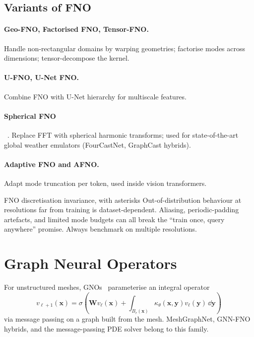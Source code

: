 \subsection{Variants of FNO}
\paragraph{Geo-FNO, Factorised FNO, Tensor-FNO.}
Handle non-rectangular domains by warping geometries; factorise modes
across dimensions; tensor-decompose the kernel.
\paragraph{U-FNO, U-Net FNO.}
Combine FNO with U-Net hierarchy for multiscale features.
\paragraph{Spherical FNO}~\cite{bonev2023sfno}.
Replace FFT with spherical harmonic transforms; used for
state-of-the-art global weather emulators (FourCastNet, GraphCast
hybrids).
\paragraph{Adaptive FNO and AFNO.}
Adapt mode truncation per token, used inside vision transformers.

\begin{pitfall}{FNO discretisation invariance, with asterisks}
Out-of-distribution behaviour at resolutions far from training is
dataset-dependent. Aliasing, periodic-padding artefacts, and limited
mode budgets can all break the ``train once, query anywhere'' promise.
Always benchmark on multiple resolutions.
\end{pitfall}

\section{Graph Neural Operators}
For unstructured meshes, GNOs~\cite{li2020gno,brandstetter2022mpneural}
parameterise an integral operator
\begin{equation}
v_{\ell+1}(\bm{x}) = \sigma\!\left(\bm{W}v_\ell(\bm{x}) + \int_{B_r(\bm{x})}\kappa_\theta(\bm{x},\bm{y})v_\ell(\bm{y})\,\dd\bm{y}\right)
\end{equation}
via message passing on a graph built from the mesh. MeshGraphNet,
GNN-FNO hybrids, and the message-passing PDE solver belong to this
family.

